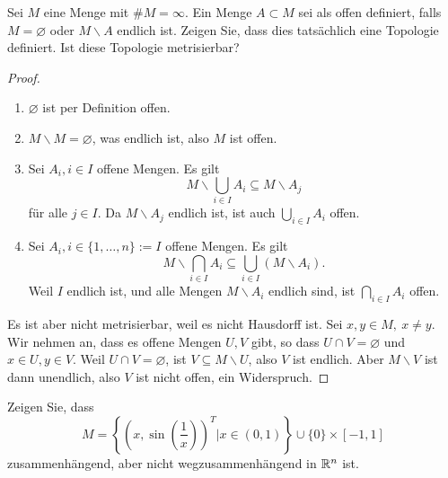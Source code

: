\begin{Problem}
	Sei $M$ eine Menge mit $\# M=\infty$. Ein Menge $A\subset M$ sei als offen definiert, falls $M=\varnothing$ oder $M\backslash A$ endlich ist. Zeigen Sie, dass dies tatsächlich eine Topologie definiert. Ist diese Topologie metrisierbar? 
\end{Problem}
\begin{proof}
	\begin{enumerate}[label=(\roman*)]
		\item $\varnothing$ ist per Definition offen.
		\item $M\backslash M=\varnothing$, was endlich ist, also $M$ ist offen. 
		\item Sei $A_i,i\in I$ offene Mengen. Es gilt
			\[
			M\backslash \bigcup_{i\in I} A_i\subseteq M\backslash A_j 
		\]
		f\"{u}r alle $j\in I$. Da $M\backslash A_j$ endlich ist, ist auch $\bigcup_{i\in I} A_i$ offen.
	\item Sei $A_i, i\in \{1,\dots,n\} :=I$ offene Mengen. Es gilt
		\[
			M\backslash \bigcap_{i\in I} A_i\subseteq \bigcup_{i \in  I} (M\backslash  A_i)
		.\] 
		Weil $I$ endlich ist, und alle Mengen $M\backslash A_i$ endlich sind, ist $\bigcap_{i\in I} A_i$ offen.
	\end{enumerate}
	Es ist aber nicht metrisierbar, weil es nicht Hausdorff ist. Sei $x,y\in M,~x\neq y$. Wir nehmen an, dass es offene Mengen $U,V$ gibt, so dass $U\cap V=\varnothing$ und $x\in U,y\in V$. Weil $U\cap V=\varnothing$, ist $V\subseteq M\backslash U$, also $V$ ist endlich. Aber $M\backslash V$ ist dann unendlich, also $V$ ist nicht offen, ein Widerspruch.
\end{proof}
\begin{Problem}
	Zeigen Sie, dass
	\[
		M=\left\{ \left( x, \sin\left( \frac{1}{x} \right) \right)^T|x\in (0,1) \right\} \cup \{0\} \times [-1,1]
	\]
zusammenhängend, aber nicht wegzusammenhängend in $\mathbb{R}^n$ ist.
\end{Problem}
